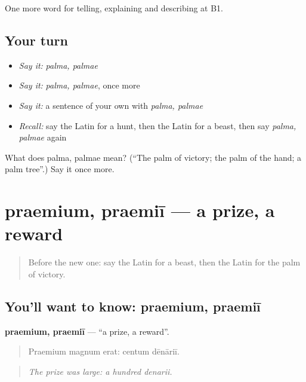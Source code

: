 \begin{grammarlens}[title={What you've built}]
One more word for telling, explaining and describing at B1.
\end{grammarlens}

\subsection*{Your turn}
\begin{itemize}
\raggedright
  \item \emph{Say it:} \emph{palma, palmae}
  \item \emph{Say it:} \emph{palma, palmae}, once more
  \item \emph{Say it:} a sentence of your own with \emph{palma, palmae}
  \item \emph{Recall:} say the Latin for a hunt, then the Latin for a beast, then say \emph{palma, palmae} again
\end{itemize}

\begin{tcolorbox}[breakable,colback=teal!4,colframe=teal!35!black,title={Before you move on}]
What does palma, palmae mean? (\textquotedblleft{}The palm of victory; the palm of the hand; a palm tree\textquotedblright{}.) Say it once more.
\end{tcolorbox}
\section[praemium, praemiī]{praemium, praemiī — a prize, a reward}

\label{lesson:LA-C337-praemium}



\begin{quote}
Before the new one: say the Latin for a beast, then the Latin for the palm of victory.
\end{quote}

\subsection*{You'll want to know: praemium, praemiī}
\textbf{praemium, praemiī} — \textquotedblleft{}a prize, a reward\textquotedblright{}.

\begin{quote}
Praemium magnum erat: centum dēnāriī.
\end{quote}

\begin{quote}
\emph{The prize was large: a hundred denarii.}
\end{quote}


